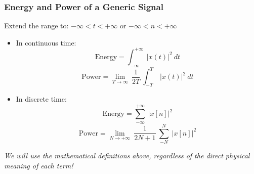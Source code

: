 \subsubsection{Energy and Power of a Generic Signal}
Extend the range to: $-\infty<t<+\infty$ or $-\infty<n<+\infty$ 
\begin{itemize}
 \item In continuous time:
  \[ \text{Energy}= \int_{-\infty}^{+\infty} \ \lvert x(t) \rvert^2 \ dt \]
  \[ \text{Power}= \lim_{T \to \infty} \ \frac{1}{2T} \ \int_{-T}^{T} \ \lvert x(t) \rvert^2 \ dt \]
 \item In discrete time:
  \[ \text{Energy}= \sum_{-\infty}^{+\infty} \ \lvert x[n] \rvert^2 \]
  \[ \text{Power}=\lim_{N \to +\infty} \ \frac{1}{2N+1} \ \sum_{-N}^{N} \ \lvert x[n] \rvert^2 \]
\end{itemize}
\textit{We will use the mathematical definitions above, regardless of the direct physical meaning of each term!}